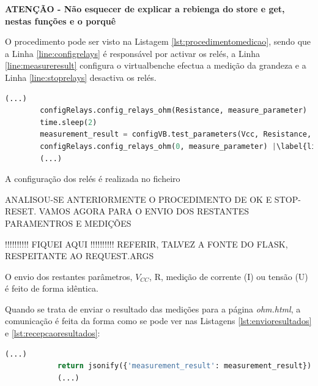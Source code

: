 \textbf{ATENÇÃO - Não esquecer de explicar a rebienga do store e get, nestas funções e o porquê}

\vspace{1cm}

O procedimento pode ser visto na Listagem \ref{lst:procedimentomedicao}, sendo que a Linha \ref{line:configrelays} é responsável por activar os relés, a Linha \ref{line:measureresult} configura o \acrshort{virtualbench}e efectua a medição da grandeza e a Linha \ref{line:stoprelays} desactiva os relés.

\begin{minipage}{0.9\linewidth}
	\begin{lstlisting}[language=python, escapechar=|, caption=Procedimento de medição, label=lst:procedimentomedicao]
		(...)
		configRelays.config_relays_ohm(Resistance, measure_parameter) |\label{line:configrelays}|
		time.sleep(2)
		measurement_result = configVB.test_parameters(Vcc, Resistance, measure_parameter) |\label{line:measureresult}|
		configRelays.config_relays_ohm(0, measure_parameter) |\label{line:stoprelays}|
		(...)
	\end{lstlisting}
\end{minipage}


A configuração dos relés é realizada no ficheiro 

ANALISOU-SE ANTERIORMENTE O PROCEDIMENTO DE OK E STOP-RESET. VAMOS AGORA PARA O ENVIO DOS RESTANTES PARAMENTROS E MEDIÇÕES

!!!!!!!!!! FIQUEI AQUI !!!!!!!!!!
REFERIR, TALVEZ A FONTE DO FLASK, RESPEITANTE AO REQUEST.ARGS

O envio dos restantes parâmetros, $V_{CC}$, R, medição de corrente (I) ou tensão (U) é feito de forma idêntica.

Quando se trata de enviar o resultado das medições para a página \textit{ohm.html}, a comunicação é feita da forma como se pode ver nas Listagens \ref{lst:envioresultados} e \ref{lst:recepcaoresultados}:
\begin{center}
	\begin{minipage}{0.7\linewidth}
		\begin{lstlisting}[language=python, caption=Envio de resultados do servidor (\textit{views.py}) para a página \textit{ohm.html}, label=lst:envioresultados]
			(...)
			return jsonify({'measurement_result': measurement_result})
			(...)
	\end{lstlisting}
	\end{minipage}
\end{center}


